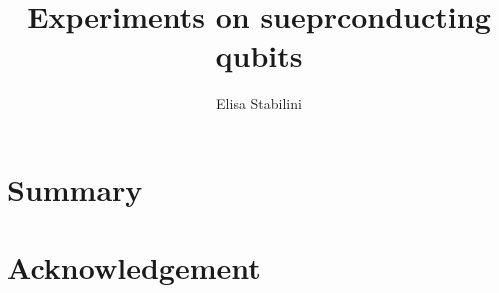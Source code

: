 \documentclass{book}
\title{Experiments on sueprconducting qubits}
\author{Elisa Stabilini}
\date{}
\begin{document}


\clearpage



\clearpage
\tableofcontents
\clearpage

\chapter*{Summary}
%
%


\chapter*{Acknowledgement}
\end{document}
